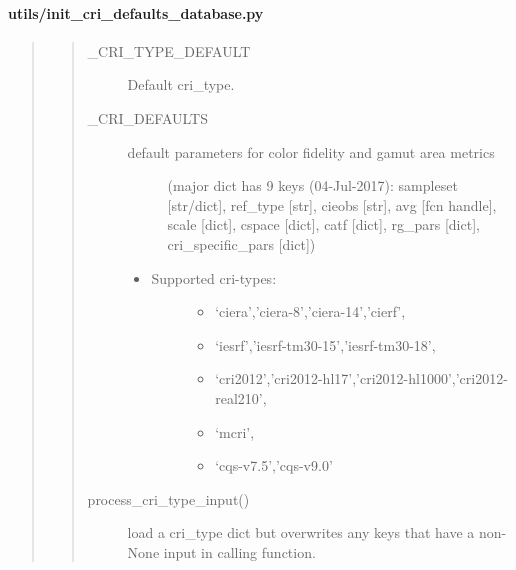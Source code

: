 \documentclass[letterpaper,10pt,english]{sphinxmanual}
\begin{document}
\paragraph{utils/init\_cri\_defaults\_database.py}
\label{\detokenize{color:utils-init-cri-defaults-database-py}}\begin{quote}
\begin{quote}\begin{description}
\item[{\_CRI\_TYPE\_DEFAULT}] \leavevmode
Default cri\_type.

\item[{\_CRI\_DEFAULTS}] \leavevmode\begin{description}
\item[{default parameters for color fidelity and gamut area metrics }] \leavevmode
(major dict has 9 keys (04-Jul-2017): 
sampleset {[}str/dict{]}, 
ref\_type {[}str{]}, 
cieobs {[}str{]}, 
avg {[}fcn handle{]}, 
scale {[}dict{]}, 
cspace {[}dict{]}, 
catf {[}dict{]}, 
rg\_pars {[}dict{]}, 
cri\_specific\_pars {[}dict{]})

\end{description}
\begin{itemize}
\item {} \begin{description}
\item[{Supported cri-types:}] \leavevmode\begin{itemize}
\item {} 
‘ciera’,’ciera-8’,’ciera-14’,’cierf’,

\item {} 
‘iesrf’,’iesrf-tm30-15’,’iesrf-tm30-18’,

\item {} 
‘cri2012’,’cri2012-hl17’,’cri2012-hl1000’,’cri2012-real210’,

\item {} 
‘mcri’,

\item {} 
‘cqs-v7.5’,’cqs-v9.0’

\end{itemize}

\end{description}

\end{itemize}

\item[{process\_cri\_type\_input()}] \leavevmode
load a cri\_type dict but overwrites any keys that 
have a non-None input in calling function.

\end{description}\end{quote}
\end{quote}
\end{document}
